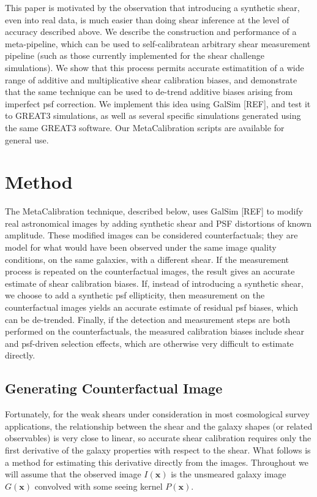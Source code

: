 \documentclass[iop]{emulateapj}
\begin{document}
This paper is motivated by the observation that introducing a synthetic shear, even into real data, is much easier than doing shear inference at the level of accuracy described above. We describe the construction and performance of a meta-pipeline, which can be used to self-calibratean arbitrary shear measurement pipeline  (such as those currently implemented for the shear challenge simulations). We show that this process permits accurate estimatition of a wide range of additive and multiplicative shear calibration biases, and demonstrate that the same technique can be used to de-trend additive biases arising from imperfect psf correction. We implement this idea using GalSim [REF], and test it to GREAT3 simulations, as well as several specific simulations generated using the same GREAT3 software. Our MetaCalibration scripts are available for general use.

\section{Method}
The MetaCalibration technique, described below, uses GalSim [REF] to modify real astronomical images by adding synthetic shear and PSF distortions of known amplitude. These modified images can be considered counterfactuals;  they are model for what would have been observed under the same image quality conditions, on the same galaxies, with a different shear. If the measurement process is repeated on the counterfactual images, the result gives an accurate estimate of shear calibration biases. If, instead of introducing a synthetic shear, we choose to add a synthetic psf ellipticity, then measurement on the counterfactual images yields an accurate estimate of residual psf biases, which can be de-trended. Finally, if the detection and measurement steps are both performed on the counterfactuals, the measured calibration biases include shear and psf-driven selection effects, which are otherwise very difficult to estimate directly.

\subsection{Generating Counterfactual Image}
Fortunately, for the weak shears under consideration in most cosmological survey applications, the relationship between the shear and the galaxy shapes (or related observables) is very close to linear, so accurate shear calibration requires only the first derivative of the galaxy properties with respect to the shear. What follows is a method for estimating this derivative directly from the images. Throughout we will assume that the observed image $I({\mathbf{x}})$ is the unsmeared galaxy image $G(\mathbf{x})$ convolved with some seeing kernel $P(\mathbf{x})$.
\end{document}
